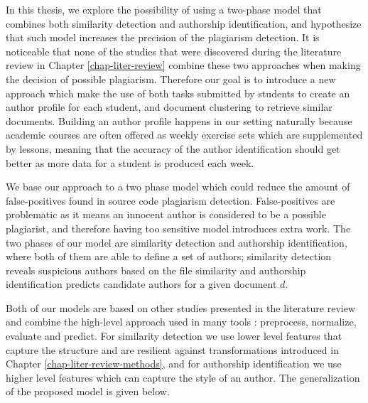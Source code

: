 
In this thesis, we explore the possibility of using a two-phase model that combines both similarity detection and authorship identification, and hypothesize that such model increases the precision of the plagiarism detection. It is noticeable that none of the studies that were discovered during the literature review in Chapter \ref{chap-liter-review} combine these two approaches when making the decision of possible plagiarism. Therefore our goal is to introduce a new approach which make the use of both tasks submitted by students to create an author profile for each student, and document clustering to retrieve similar documents. Building an author profile happens in our setting naturally because academic courses are often offered as weekly exercise sets which are supplemented by lessons, meaning that the accuracy of the author identification should get better as more data for a student is produced each week. 



We base our approach to a two phase model which could reduce the amount of false-positives found in source code plagiarism detection. False-positives are problematic as it means an innocent author is considered to be a possible plagiarist, and therefore having too sensitive model introduces extra work. The two phases of our model are similarity detection and authorship identification, where both of them are able to define a set of authors; similarity detection reveals suspicious authors based on the file similarity and authorship identification predicts candidate authors for a given document $d$. 


Both of our models are based on other studies presented in the literature review and combine the high-level approach used in many tools \cite{RSCAD2016}: preprocess, normalize, evaluate and predict. For similarity detection we use lower level features that capture the structure and are resilient against transformations introduced in Chapter \ref{chap-liter-review-methods}, and for authorship identification we use higher level features which can capture the style of an author. The generalization of the proposed model is given below.

